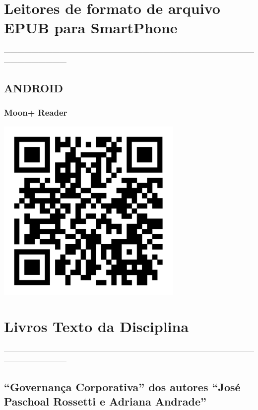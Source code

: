 \documentclass[
]{book}
\begin{document}
\section{Leitores de formato de arquivo EPUB para SmartPhone}\label{leitores-de-formato-de-arquivo-epub-para-smartphone}

---------------------------------------------------------------------------------------------------------------------------------------

\subsection{ANDROID}\label{android}

\subsubsection{\texorpdfstring{\textbf{Moon+ Reader}}{Moon+ Reader}}\label{moon-reader}

\includegraphics[width=3.54167in,height=\textheight]{images/qrcode/leitor_epub/MoonReaderPlus.jpg}

\section{Livros Texto da Disciplina}\label{livros-texto-da-disciplina}

---------------------------------------------------------------------------------------------------------------------------------------

\subsection{\texorpdfstring{``Governança Corporativa'' dos autores ``\textbf{José Paschoal Rossetti e Adriana Andrade}''}{``Governança Corporativa'' dos autores ``José Paschoal Rossetti e Adriana Andrade''}}\label{governanuxe7a-corporativa-dos-autores-josuxe9-paschoal-rossetti-e-adriana-andrade}
\end{document}
